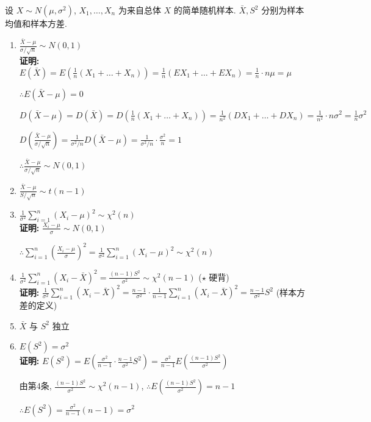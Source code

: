 \documentclass[padp]{ExBook}
\begin{document}
设 $X \sim N(\mu, \sigma^2)$, $X_1, \dots, X_n$ 为来自总体 $X$ 的简单随机样本.
$\bar{X}, S^2$ 分别为样本均值和样本方差.

\begin{enumerate}[label=\arabic*.]
    \item $\frac{\bar{X}-\mu}{\sigma/\sqrt{n}} \sim N(0,1)$ \\
    \textbf{证明:}
    $E(\bar{X}) = E\left(\frac{1}{n}(X_1+\dots+X_n)\right) = \frac{1}{n}(EX_1+\dots+EX_n) = \frac{1}{n} \cdot n\mu = \mu$
    
    $\therefore E(\bar{X}-\mu) = 0$
    
    $D(\bar{X}-\mu) = D(\bar{X}) = D\left(\frac{1}{n}(X_1+\dots+X_n)\right) = \frac{1}{n^2}(DX_1+\dots+DX_n) = \frac{1}{n^2} \cdot n\sigma^2 = \frac{1}{n}\sigma^2$
    
    $D\left(\frac{\bar{X}-\mu}{\sigma/\sqrt{n}}\right) = \frac{1}{\sigma^2/n} D(\bar{X}-\mu) = \frac{1}{\sigma^2/n} \cdot \frac{\sigma^2}{n} = 1$
    
    $\therefore \frac{\bar{X}-\mu}{\sigma/\sqrt{n}} \sim N(0,1)$

    \item $\frac{\bar{X}-\mu}{S/\sqrt{n}} \sim t(n-1)$

    \item $\frac{1}{\sigma^2}\sum_{i=1}^{n}(X_i-\mu)^2 \sim \chi^2(n)$ \\
    \textbf{证明:} $\frac{X_i-\mu}{\sigma} \sim N(0,1)$
    
    $\therefore \sum_{i=1}^{n}\left(\frac{X_i-\mu}{\sigma}\right)^2 = \frac{1}{\sigma^2}\sum_{i=1}^{n}(X_i-\mu)^2 \sim \chi^2(n)$

    \item $\frac{1}{\sigma^2}\sum_{i=1}^{n}(X_i-\bar{X})^2 = \frac{(n-1)S^2}{\sigma^2} \sim \chi^2(n-1)$ \quad ($\star$ 硬背) \\
    \textbf{证明:} $\frac{1}{\sigma^2}\sum_{i=1}^{n}(X_i-\bar{X})^2 = \frac{n-1}{\sigma^2} \cdot \frac{1}{n-1}\sum_{i=1}^{n}(X_i-\bar{X})^2 = \frac{n-1}{\sigma^2}S^2$ \quad (样本方差的定义)

    \item $\bar{X}$ 与 $S^2$ 独立

    \item $E(S^2) = \sigma^2$ \\
    \textbf{证明:}
    $E(S^2) = E\left(\frac{\sigma^2}{n-1} \cdot \frac{n-1}{\sigma^2}S^2\right) = \frac{\sigma^2}{n-1} E\left(\frac{(n-1)S^2}{\sigma^2}\right)$
    
    由第4条, $\frac{(n-1)S^2}{\sigma^2} \sim \chi^2(n-1)$,
    $\therefore E\left(\frac{(n-1)S^2}{\sigma^2}\right) = n-1$
    
    $\therefore E(S^2) = \frac{\sigma^2}{n-1}(n-1) = \sigma^2$

\end{enumerate}
\end{document}

